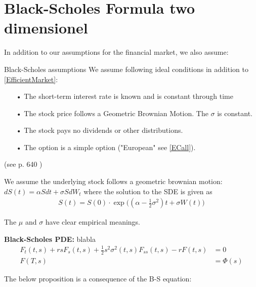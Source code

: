 
\section{Black-Scholes Formula two dimensionel}
In addition to our assumptions for the financial market, we also assume:\\
\theoremstyle{assumption}
\begin{assumption}{Black-Scholes assumptions}\label{BS-Assumption}
We assume following ideal conditions in addition to \eqref{EfficientMarket}:
\begin{enumerate}
\item[•] The short-term interest rate is known and is constant through time 
\item[•] The stock price follows a Geometric Brownian Motion. The $\sigma$ is constant.\item[•] The stock pays no dividends or other distributions.
\item[•] The option is a simple option ("European" see \eqref{ECall}).
\end{enumerate}
(see p. 640 \parencite{B-S-Paper})
\end{assumption}

We assume the underlying stock follows a geometric brownian motion:
$dS(t)=\alpha S dt + \sigma S dW_t$ where the solution to the SDE is given as
\begin{equation}\label{GBM}
\begin{split}
S(t)=S(0) \cdot \exp \bigg( (\alpha -\frac{1}{2} \sigma^2) t + \sigma W(t) \bigg)
\end{split}
\end{equation}

The $\mu$ and $\sigma$ have clear empirical meanings.


\begin{theorem}\label{BS-PDE}
\textbf{Black-Scholes PDE:}
blabla
\begin{align}
F_t(t,s)+rsF_s(t,s)+\frac{1}{2} s^2 \sigma^2(t,s)F_{ss}(t,s) -rF(t,s)&=0\\
F(T,s)&=\Phi(s)
\end{align}
\end{theorem}
The below proposition is a consequence of the B-S equation:

